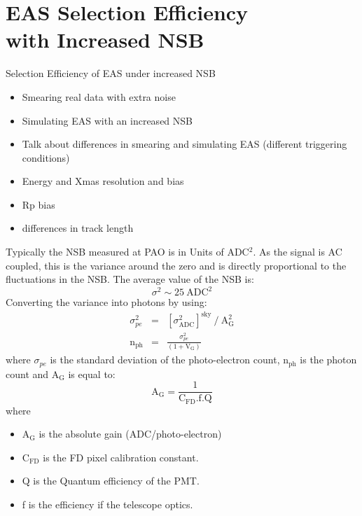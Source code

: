 \chapter[EAS Selection Efficiency with Increased NSB]{\centering EAS Selection Efficiency \\ with Increased NSB \\}\label{Ch:SelectEff}


Selection Efficiency of EAS under increased NSB
\begin{itemize}
\item Smearing real data with extra noise
\item Simulating EAS with an increased NSB
\item Talk about differences in smearing and simulating EAS (different triggering conditions)
\item Energy and Xmas resolution and bias
\item Rp bias
\item differences in track length
\end{itemize}



Typically the NSB measured at PAO is in Units of ADC$^2$. As the signal is AC coupled, this is the variance around the zero and is directly proportional to the fluctuations in the NSB. The average value of the NSB is:
\begin{equation}
\sigma^2 \sim 25 \ \mathrm{ADC}^2
\end{equation}
Converting the variance into photons by using:
\begin{eqnarray}
\sigma^2_{pe} &=& [\sigma^2_{\mathrm{ADC}}]^{\mathrm{sky}} \ / \ \mathrm{A}^2_{\mathrm{G}} \label{eq:simgaPE} \\
\mathrm{n}_{\mathrm{ph}} &=& \frac{\sigma^2_{pe}}{(1 + \mathrm{V}_{\mathrm{G}})} \label{eq:numPhoton}
\end{eqnarray}
where $\sigma_{pe}$ is the standard deviation of the photo-electron count, n$_{\mathrm{ph}}$ is the photon count and A$_{\mathrm{G}}$ is equal to:
\begin{equation}\label{eq:abs_gain}
\mathrm{A}_{\mathrm{G}} = \frac{1}{\mathrm{C}_{\mathrm{FD}}.\mathrm{f}.\mathrm{Q}}
\end{equation}
where
\begin{itemize}
\item[] A$_{\mathrm{G}}$ is the absolute gain (ADC/photo-electron)
\item[] $\mathrm{C}_{\mathrm{FD}}$ is the FD pixel calibration constant.
\item[] Q is the Quantum efficiency of the PMT.
\item[] f is the efficiency if the telescope optics.
\end{itemize}

